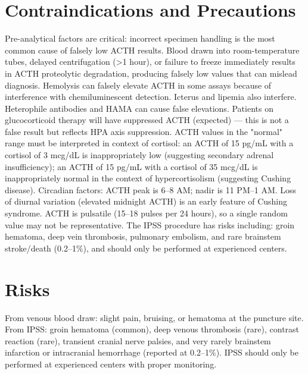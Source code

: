 \section*{Contraindications and Precautions}
Pre-analytical factors are critical: incorrect specimen handling is the most common cause of falsely low ACTH results. Blood drawn into room-temperature tubes, delayed centrifugation (>1 hour), or failure to freeze immediately results in ACTH proteolytic degradation, producing falsely low values that can mislead diagnosis. Hemolysis can falsely elevate ACTH in some assays because of interference with chemiluminescent detection. Icterus and lipemia also interfere. Heterophile antibodies and HAMA can cause false elevations. Patients on glucocorticoid therapy will have suppressed ACTH (expected) --- this is not a false result but reflects HPA axis suppression. ACTH values in the "normal" range must be interpreted in context of cortisol: an ACTH of 15 pg/mL with a cortisol of 3 mcg/dL is inappropriately low (suggesting secondary adrenal insufficiency); an ACTH of 15 pg/mL with a cortisol of 35 mcg/dL is inappropriately normal in the context of hypercortisolism (suggesting Cushing disease). Circadian factors: ACTH peak is 6--8 AM; nadir is 11 PM--1 AM. Loss of diurnal variation (elevated midnight ACTH) is an early feature of Cushing syndrome. ACTH is pulsatile (15--18 pulses per 24 hours), so a single random value may not be representative. The IPSS procedure has risks including: groin hematoma, deep vein thrombosis, pulmonary embolism, and rare brainstem stroke/death (0.2--1\%), and should only be performed at experienced centers.

\section*{Risks}
From venous blood draw: slight pain, bruising, or hematoma at the puncture site. From IPSS: groin hematoma (common), deep venous thrombosis (rare), contrast reaction (rare), transient cranial nerve palsies, and very rarely brainstem infarction or intracranial hemorrhage (reported at 0.2--1\%). IPSS should only be performed at experienced centers with proper monitoring.

